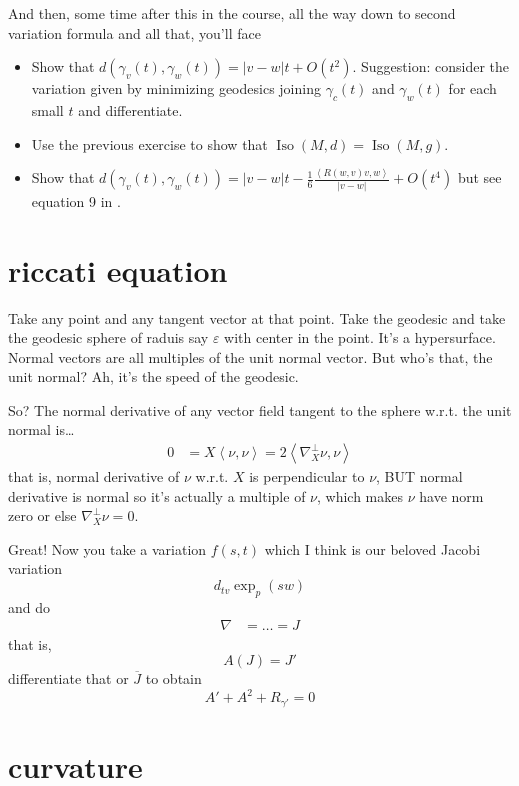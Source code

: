And then, some time after this in the course, all the way down to second variation formula and all that, you'll face
\begin{exercise}\leavevmode
\begin{itemize}
\item Show that \(d(\gamma_v(t),\gamma_w(t))=|v-w|t+O(t^2)\). Suggestion: consider the variation given by minimizing geodesics joining \(\gamma_c(t)\) and \(\gamma_w(t)\) for each small \(t\) and differentiate.
\item Use the previous exercise to show that \(\operatorname{Iso}(M,d)=\operatorname{Iso}(M,g)\).
\item Show that \(d(\gamma_v(t),\gamma_w(t))=|v-w|t-\frac{1}{6}\frac{\left<R(w,v)v,w\right>}{|v-w|}+O(t^4)\) but see equation 9 in \cite{mey}.
\end{itemize}
\end{exercise}


\section{riccati equation}

Take any point and any tangent vector at that point. Take the geodesic and take the geodesic sphere of raduis say \(\varepsilon\) with center in the point. It's a hypersurface. Normal vectors are all multiples of the unit normal vector. But who's that, the unit normal? Ah, it's the speed of the geodesic.



So? The normal derivative of any vector field tangent to the sphere w.r.t. the unit normal is…
\begin{align*}
0&=X\left<\nu,\nu\right>=2\left<\nabla^\perp_X \nu,\nu\right>
\end{align*}
that is, normal derivative of \(\nu\) w.r.t. \(X\) is perpendicular to \(\nu\), BUT normal derivative is normal so it's actually a multiple of \(\nu\), which makes \(\nu\) have norm zero or else \(\nabla^\perp_X \nu=0\).

Great! Now you take a variation \(f(s,t)\) which I think is our beloved Jacobi variation
\[d_{tv}\operatorname{exp}_p(sw)\]
and do
\begin{align*}
\nabla &= \ldots=J
\end{align*}
that is,
\[A(J)=J'\]
differentiate that or \(\overline{J}\) to obtain
\[A'+A^2+R_{\gamma'}=0\]

\section{curvature}

